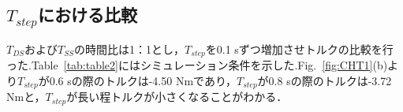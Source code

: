 \documentclass[twocolumn]{jsarticle}
\begin{document}
\subsection{$T_{step}$における比較}
$T_{DS}$および$T_{SS}$の時間比は1：1とし，$T_{step}$を0.1 sずつ増加させトルクの比較を行った.Table~\ref{tab:table2}にはシミュレーション条件を示した.Fig.~\ref{fig:CHT1}(b)より$T_{step}$が0.6 sの際のトルクは-4.50 Nmであり，$T_{step}$が0.8 sの際のトルクは-3.72 Nmと，$T_{step}$が長い程トルクが小さくなることがわかる．
\end{document}
